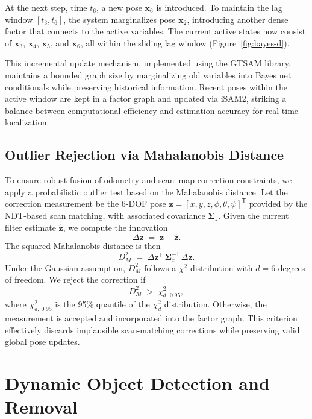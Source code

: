 At the next step, time \( t_6 \), a new pose \( \mathbf{x}_6 \) is introduced. To maintain the lag window \( [t_3, t_6] \), the system marginalizes pose \( \mathbf{x}_2 \), introducing another dense factor that connects to the active variables. The current active states now consist of \( \mathbf{x}_3 \), \( \mathbf{x}_4 \), \( \mathbf{x}_5 \), and \( \mathbf{x}_6 \), all within the sliding lag window (Figure~\ref{fig:bayes-d}).

This incremental update mechanism, implemented using the GTSAM library, maintains a bounded graph size by marginalizing old variables into Bayes net conditionals while preserving historical information. Recent poses within the active window are kept in a factor graph and updated via iSAM2, striking a balance between computational efficiency and estimation accuracy for real-time localization.

\subsection{Outlier Rejection via Mahalanobis Distance}

To ensure robust fusion of odometry and scan–map correction constraints, we apply a probabilistic outlier test based on the Mahalanobis distance. Let the correction measurement be the 6-DOF pose  
\(\mathbf{z} = [x, y, z, \phi, \theta, \psi]^\mathsf{T}\)  
provided by the NDT-based scan matching, with associated covariance \(\mathbf{\Sigma}_z\). Given the current filter estimate \(\hat{\mathbf{z}}\), we compute the innovation  
\[
\Delta \mathbf{z} \;=\; \mathbf{z} - \hat{\mathbf{z}}.
\]  
The squared Mahalanobis distance is then
\begin{equation}
	\label{eq:mahalanobis}
	D_M^2 \;=\;\Delta \mathbf{z}^\mathsf{T}\,\mathbf{\Sigma}_z^{-1}\,\Delta \mathbf{z}.
\end{equation}
Under the Gaussian assumption, \(D_M^2\) follows a \(\chi^2\) distribution with \(d=6\) degrees of freedom. We reject the correction if
\begin{equation}
	\label{eq:threshold}
	D_M^2 \;>\;\chi^2_{d,\,0.95},
\end{equation}
where \(\chi^2_{d,\,0.95}\) is the 95\% quantile of the \(\chi^2_d\) distribution. Otherwise, the measurement is accepted and incorporated into the factor graph. This criterion effectively discards implausible scan-matching corrections while preserving valid global pose updates.


\section{Dynamic Object Detection and Removal}
\label{sec:dynamic_object_removal}

